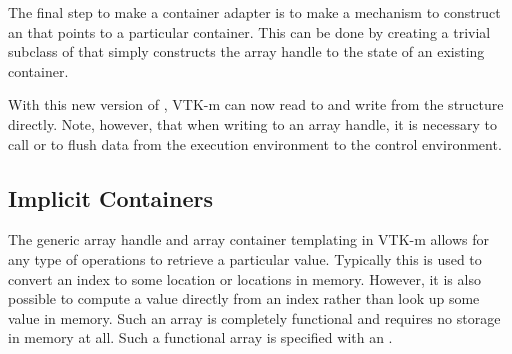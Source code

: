 
The final step to make a container adapter is to make a mechanism to
construct an  that points to a particular
container. This can be done by creating a trivial subclass of
 that simply constructs the array handle to the state
of an existing container.


With this new version of , VTK-m can now read
to and write from the  structure directly. Note,
however, that when writing to an array handle, it is necessary to call
 or  to flush
data from the execution environment to the control environment. 




\subsection{Implicit Containers}


The generic array handle and array container templating in VTK-m allows for
any type of operations to retrieve a particular value. Typically this is
used to convert an index to some location or locations in memory. However,
it is also possible to compute a value directly from an index rather than
look up some value in memory. Such an array is completely functional and
requires no storage in memory at all. Such a functional array is specified
with an .



